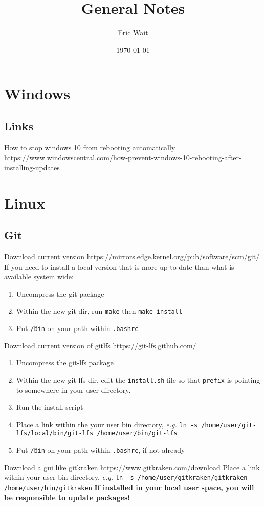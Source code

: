 \documentclass[11pt]{article}
\author{Eric Wait}
\title{General Notes}
\date{\today}
\newcommand{\eg}[1]{\textit{e.g.} {#1}}
\begin{document}
	\maketitle
	\newpage

	\listoftodos
	\newpage

	\section{Windows}
		\subsection*{Links}
			How to stop windows 10 from rebooting automatically \href{https://www.windowscentral.com/how-prevent-windows-10-rebooting-after-installing-updates}{https://www.windowscentral.com/how-prevent-windows-10-rebooting-after-installing-updates}

	\section{Linux}
		\subsection*{Git}
			Download current version \href{https://mirrors.edge.kernel.org/pub/software/scm/git/}{https://mirrors.edge.kernel.org/pub/software/scm/git/}
			If you need to install a local version that is more up-to-date than what is available system wide:
			\begin{enumerate}
				\item Uncompress the git package
				\item Within the new git dir, run \texttt{make} then \texttt{make install}
				\item Put \texttt{\~/bin} on your path within \texttt{.bashrc}
			\end{enumerate}
			Download current version of gitlfs \href{https://git-lfs.github.com/}{https://git-lfs.github.com/}
			\begin{enumerate}
				\item Uncompress the git-lfs package
				\item Within the new git-lfs dir, edit the \texttt{install.sh} file so that \texttt{prefix} is pointing to somewhere in your user directory.
				\item Run the install script
				\item Place a link within the your user bin directory, \eg{\texttt{ln -s /home/user/git-lfs/local/bin/git-lfs /home/user/bin/git-lfs}}
				\item Put \texttt{\~/bin} on your path within \texttt{.bashrc}, if not already
			\end{enumerate}
			Download a gui like gitkraken \href{https://www.gitkraken.com/download}{https://www.gitkraken.com/download}
			Place a link within your user bin directory, \eg{\texttt{ln -s /home/user/gitkraken/gitkraken /home/user/bin/gitkraken}}
			\textbf{\color{red} If installed in your local user space, you will be responsible to update packages!}
	\newpage
	
\end{document}
